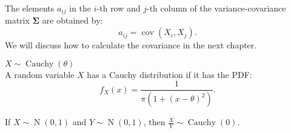 \documentclass{huhtakm-template-book-v2}
\DeclareMathOperator{\N}{N}
\DeclareMathOperator{\Cauchy}{Cauchy}
\DeclareMathOperator{\cov}{cov}
\begin{document}
    \begin{rem}
        The elements $a_{ij}$ in the $i$-th row and $j$-th column of the variance-covariance matrix $\mathbf{\Sigma}$ are obtained by:
        \begin{equation*}
            a_{ij} = \cov(X_{i},X_{j}).
        \end{equation*}
        We will discuss how to calculate the covariance in the next chapter.
    \end{rem}
    \begin{eg} $X \sim \Cauchy(\theta)$\\
        A random variable $X$ has a Cauchy distribution if it has the PDF:
        \begin{equation*}
            f_{X}(x) = \frac{1}{\pi(1+(x-\theta)^{2})}.
        \end{equation*}
    \end{eg}
    \begin{rem}
        If $X \sim \N(0,1)$ and $Y \sim \N(0,1)$, then $\frac{X}{Y} \sim \Cauchy(0)$.
    \end{rem}
    \newpage
\end{document}
